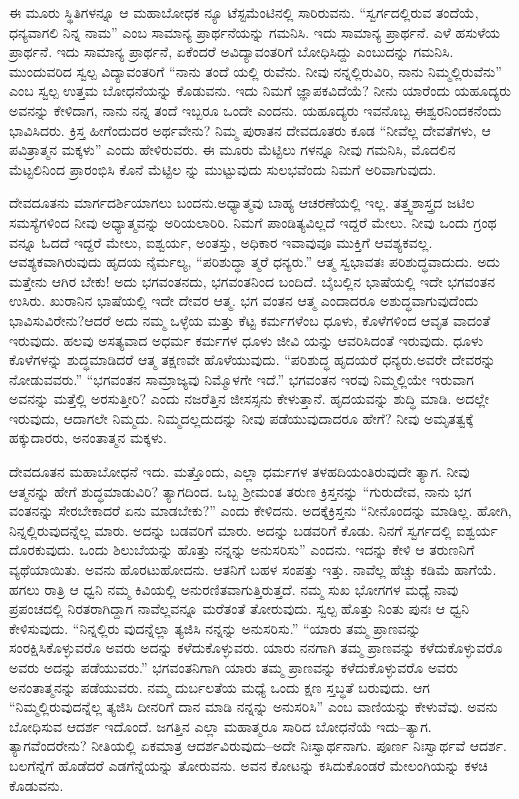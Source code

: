 ಈ ಮೂರು ಸ್ಥಿತಿಗಳನ್ನೂ ಆ ಮಹಾಬೋಧಕ ನ್ಯೂ ಟೆಸ್ಟಮೆಂಟಿನಲ್ಲಿ ಸಾರಿರುವನು. “ಸ್ವರ್ಗದಲ್ಲಿರುವ ತಂದೆಯೆ, ಧನ್ಯವಾಗಲಿ ನಿನ್ನ ನಾಮ” ಎಂಬ ಸಾಮಾನ್ಯ ಪ್ರಾರ್ಥನೆಯನ್ನು ಗಮನಿಸಿ. ಇದು ಸಾಮಾನ್ಯ ಪ್ರಾರ್ಥನೆ. ಎಳೆ ಹಸುಳೆಯ ಪ್ರಾರ್ಥನೆ. ಇದು ಸಾಮಾನ್ಯ ಪ್ರಾರ್ಥನೆ, ಏಕೆಂದರೆ ಅವಿದ್ಯಾವಂತರಿಗೆ ಬೋಧಿಸಿದ್ದು ಎಂಬುದನ್ನು ಗಮನಿಸಿ. ಮುಂದುವರಿದ ಸ್ವಲ್ಪ ವಿದ್ಯಾವಂತರಿಗೆ “ನಾನು ತಂದೆ ಯಲ್ಲಿ ರುವೆನು. ನೀವು ನನ್ನಲ್ಲಿರುವಿರಿ, ನಾನು ನಿಮ್ಮಲ್ಲಿರುವೆನು” ಎಂಬ ಸ್ವಲ್ಪ ಉತ್ತಮ ಬೋಧನೆಯನ್ನು ಕೊಡುವನು. ಇದು ನಿಮಗೆ ಜ್ಞಾಪಕವಿದೆಯೆ? ನೀನು ಯಾರೆಂದು ಯಹೂದ್ಯರು ಅವನನ್ನು ಕೇಳಿದಾಗ, ನಾನು ನನ್ನ ತಂದೆ ಇಬ್ಬರೂ ಒಂದೇ ಎಂದನು. ಯಹೂದ್ಯರು ಇವನೊಬ್ಬ ಈಶ್ವರನಿಂದಕನೆಂದು ಭಾವಿಸಿದರು. ಕ್ರಿಸ್ತ ಹೀಗೆಂದುದರ ಅರ್ಥವೇನು? ನಿಮ್ಮ ಪುರಾತನ ದೇವದೂತರು ಕೂಡ “ನೀವೆಲ್ಲ ದೇವತೆಗಳು, ಆ ಪವಿತ್ರಾತ್ಮನ ಮಕ್ಕಳು” ಎಂದು ಹೇಳಿರುವರು. ಈ ಮೂರು ಮೆಟ್ಟಿಲು ಗಳನ್ನೂ ನೀವು ಗಮನಿಸಿ, ಮೊದಲಿನ ಮೆಟ್ಟಲಿನಿಂದ ಪ್ರಾರಂಭಿಸಿ ಕೊನೆ ಮೆಟ್ಟಿಲ ನ್ನು ಮುಟ್ಟುವುದು ಸುಲಭವೆಂದು ನಿಮಗೆ ಅರಿವಾಗುವುದು.

ದೇವದೂತನು ಮಾರ್ಗದರ್ಶಿಯಾಗಲು ಬಂದನು.ಅಧ್ಯಾತ್ಮವು ಬಾಹ್ಯ ಆಚರಣೆಯಲ್ಲಿ ಇಲ್ಲ. ತತ್ತ್ವಶಾಸ್ತ್ರದ ಜಟಿಲ ಸಮಸ್ಯೆಗಳಿಂದ ನೀವು ಅಧ್ಯಾತ್ಮವನ್ನು ಅರಿಯಲಾರಿರಿ. ನಿಮಗೆ ಪಾಂಡಿತ್ಯವಿಲ್ಲದೆ ಇದ್ದರೆ ಮೇಲು. ನೀವು ಒಂದು ಗ್ರಂಥ ವನ್ನೂ ಓದದೆ ಇದ್ದರೆ ಮೇಲು, ಐಶ್ವರ್ಯ, ಅಂತಸ್ತು, ಅಧಿಕಾರ ಇವಾವುವೂ ಮುಕ್ತಿಗೆ ಆವಶ್ಯಕವಲ್ಲ. ಆವಶ್ಯಕವಾಗಿರುವುದು ಹೃದಯ ನೈರ್ಮಲ್ಯ, “ಪರಿಶುದ್ಧಾ ತ್ಮರೆ ಧನ್ಯರು.” ಆತ್ಮ ಸ್ವಭಾವತಃ ಪರಿಶುದ್ಧವಾದುದು. ಅದು ಮತ್ತೇನು ಆಗಿರ ಬೇಕು! ಅದು ಭಗವಂತನದು, ಭಗವಂತನಿಂದ ಬಂದಿದೆ. ಬೈಬಲ್ಲಿನ ಭಾಷೆಯಲ್ಲಿ ಇದೇ ಭಗವಂತನ ಉಸಿರು. ಖುರಾನಿನ ಭಾಷೆಯಲ್ಲಿ ಇದೇ ದೇವರ ಆತ್ಮ. ಭಗ ವಂತನ ಆತ್ಮ ಎಂದಾದರೂ ಅಶುದ್ಧವಾಗುವುದೆಂದು ಭಾವಿಸುವಿರೇನು?ಆದರೆ ಅದು ನಮ್ಮ ಒಳ್ಳೆಯ ಮತ್ತು ಕೆಟ್ಟ ಕರ್ಮಗಳೆಂಬ ಧೂಳು, ಕೊಳೆಗಳಿಂದ ಆವೃತ ವಾದಂತೆ ಇರುವುದು. ಹಲವು ಅಸತ್ಯವಾದ ಅಧರ್ಮ ಕರ್ಮಗಳ ಧೂಳು ಜೀವಿ ಯನ್ನು ಆವರಿಸಿದಂತೆ ಇರುವುದು. ಧೂಳು ಕೊಳೆಗಳನ್ನು ಶುದ್ಧಮಾಡಿದರೆ ಆತ್ಮ ತಕ್ಷಣವೇ ಹೊಳೆಯುವುದು. “ಪರಿಶುದ್ಧ ಹೃದಯರೆ ಧನ್ಯರು.ಅವರೇ ದೇವರನ್ನು ನೋಡುವವರು.” “ಭಗವಂತನ ಸಾಮ್ರಾಜ್ಯವು ನಿಮ್ಮೊಳಗೇ ಇದೆ.” ಭಗವಂತನ ಇರವು ನಿಮ್ಮಲ್ಲಿಯೇ ಇರುವಾಗ ಅವನನ್ನು ಮತ್ತೆಲ್ಲಿ ಅರಸುತ್ತೀರಿ? ಎಂದು ನಜರೆತ್ತಿನ ಜೀಸಸ್ಸನು ಕೇಳುತ್ತಾನೆ. ಹೃದಯವನ್ನು ಶುದ್ಧಿ ಮಾಡಿ. ಅದಲ್ಲೇ ಇರುವುದು, ಆದಾಗಲೇ ನಿಮ್ಮದು. ನಿಮ್ಮದಲ್ಲದುದನ್ನು ನೀವು ಪಡೆಯುವುದಾದರೂ ಹೇಗೆ? ನೀವು ಅಮೃತತ್ವಕ್ಕೆ ಹಕ್ಕು\-ದಾರರು, ಅನಂತಾತ್ಮನ ಮಕ್ಕಳು.

ದೇವದೂತನ ಮಹಾಬೋಧನೆ ಇದು. ಮತ್ತೊಂದು, ಎಲ್ಲಾ ಧರ್ಮಗಳ ತಳಹದಿಯಂತಿರುವುದೇ ತ್ಯಾಗ. ನೀವು ಆತ್ಮನನ್ನು ಹೇಗೆ ಶುದ್ಧಮಾಡುವಿರಿ? ತ್ಯಾಗದಿಂದ. ಒಬ್ಬ ಶ‍್ರೀಮಂತ ತರುಣ ಕ್ರಿಸ್ತನನ್ನು “ಗುರುದೇವ, ನಾನು ಭಗ ವಂತನನ್ನು ಸೇರಬೇಕಾದರೆ ಏನು ಮಾಡಬೇಕು?” ಎಂದು ಕೇಳಿದನು. ಅದಕ್ಕೆಕ್ರಿಸ್ತನು “ನೀನೊಂದನ್ನು ಮಾಡಿಲ್ಲ. ಹೋಗಿ, ನಿನ್ನಲ್ಲಿರುವುದನ್ನೆಲ್ಲ ಮಾರು. ಅದನ್ನು ಬಡವರಿಗೆ ಮಾರು. ಅದನ್ನು ಬಡವರಿಗೆ ಕೊಡು. ನಿನಗೆ ಸ್ವರ್ಗದಲ್ಲಿ ಐಶ್ವರ್ಯ ದೊರಕುವುದು. ಒಂದು ಶಿಲುಬೆಯನ್ನು ಹೊತ್ತು ನನ್ನನ್ನು ಅನುಸರಿಸು” ಎಂದನು. ಇದನ್ನು ಕೇಳಿ ಆ ತರುಣನಿಗೆ ವ್ಯಥೆ\-ಯಾಯಿತು. ಅವನು ಹೊರಟುಹೋದನು. ಆತನಿಗೆ ಬಹಳ ಸಂಪತ್ತು ಇತ್ತು. ನಾವೆಲ್ಲ ಹೆಚ್ಚು ಕಡಿಮೆ ಹಾಗೆಯೆ. ಹಗಲು ರಾತ್ರಿ ಆ ಧ್ವನಿ ನಮ್ಮ ಕಿವಿಯಲ್ಲಿ ಅನುರಣಿತವಾಗುತ್ತಿರುತ್ತದೆ. ನಮ್ಮ ಸುಖ ಭೋಗಗಳ ಮಧ್ಯೆ ನಾವು ಪ್ರಪಂಚದಲ್ಲಿ ನಿರತರಾಗಿದ್ದಾಗ ನಾವೆಲ್ಲವನ್ನೂ ಮರೆತಂತೆ ತೋರುವುದು. ಸ್ವಲ್ಪ ಹೊತ್ತು ನಿಂತು ಪುನಃ ಆ ಧ್ವನಿ ಕೇಳಿಸುವುದು. “ನಿನ್ನಲ್ಲಿರು ವುದನ್ನೆಲ್ಲಾ ತ್ಯಜಿಸಿ ನನ್ನನ್ನು ಅನುಸರಿಸು.” “ಯಾರು ತಮ್ಮ ಪ್ರಾಣವನ್ನು ಸಂರಕ್ಷಿಸಿಕೊಳ್ಳುವರೊ ಅವರು ಅದನ್ನು ಕಳೆದುಕೊಳ್ಳುವರು. ಯಾರು ನನಗಾಗಿ ತಮ್ಮ ಪ್ರಾಣವನ್ನು ಕಳೆದುಕೊಳ್ಳುವರೊ ಅವರು ಅದನ್ನು ಪಡೆಯುವರು.” ಭಗವಂತನಿಗಾಗಿ ಯಾರು ತಮ್ಮ ಪ್ರಾಣವನ್ನು ಕಳೆದುಕೊಳ್ಳುವರೊ ಅವರು ಅನಂತಾತ್ಮನನ್ನು ಪಡೆಯುವರು. ನಮ್ಮ ದುರ್ಬಲತೆಯ ಮಧ್ಯೆ ಒಂದು ಕ್ಷಣ ಸ್ತಬ್ಧತೆ ಬರುವುದು. ಆಗ “ನಿಮ್ಮಲ್ಲಿರುವುದನ್ನೆಲ್ಲ ತ್ಯಜಿಸಿ ದೀನರಿಗೆ ದಾನ ಮಾಡಿ ನನ್ನನ್ನು ಅನುಸರಿಸಿ” ಎಂಬ ವಾಣಿಯನ್ನು ಕೇಳುವೆವು. ಅವನು ಬೋಧಿಸುವ ಆದರ್ಶ ಇದೊಂದೆ. ಜಗತ್ತಿನ ಎಲ್ಲಾ ಮಹಾತ್ಮರೂ ಸಾರಿದ ಬೋಧನೆಯೆ ಇದು–ತ್ಯಾಗ. ತ್ಯಾಗವೆಂದರೇನು? ನೀತಿಯಲ್ಲಿ ಏಕಮಾತ್ರ ಆದರ್ಶವಿರುವುದು–ಅದೇ ನಿಃಸ್ವಾರ್ಥನಾಗು. ಪೂರ್ಣ ನಿಃಸ್ವಾರ್ಥವೆ ಆದರ್ಶ. ಬಲಗೆನ್ನೆಗೆ ಹೊಡೆದರೆ ಎಡಗೆನ್ನೆಯನ್ನು ತೋರುವನು. ಅವನ ಕೋಟನ್ನು ಕಸಿದುಕೊಂಡರೆ ಮೇಲಂಗಿಯನ್ನು ಕಳಚಿ ಕೊಡುವನು.


